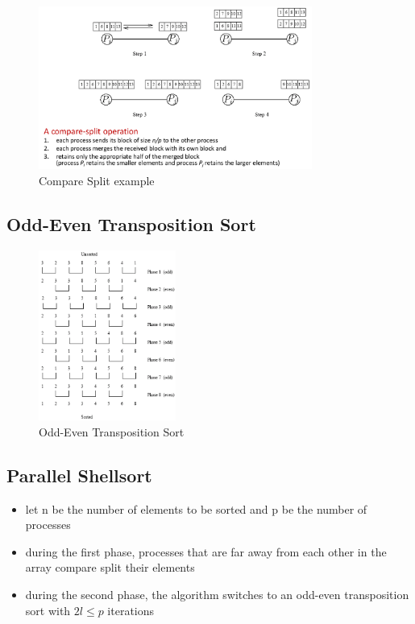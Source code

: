 \begin{figure}[H]
\centering
\includegraphics[width=0.8\textwidth]{figures/comparesplitExample.png}
\caption{Compare Split example}
\end{figure}

\hypertarget{odd-even-transposition-sort}{%
\subsection{Odd-Even Transposition
Sort}\label{odd-even-transposition-sort}}

\begin{figure}[H]
\centering
\includegraphics[width=0.4\textwidth]{figures/transpositionsort.png}
\caption{Odd-Even Transposition Sort}
\end{figure}

\hypertarget{parallel-shellsort}{%
\subsection{Parallel Shellsort}\label{parallel-shellsort}}

\begin{itemize}
\tightlist
\item
  let n be the number of elements to be sorted and p be the number of
  processes
\item
  during the first phase, processes that are far away from each other in
  the array compare split their elements
\item
  during the second phase, the algorithm switches to an odd-even
  transposition sort with $2l \leq p$ iterations
\end{itemize}

